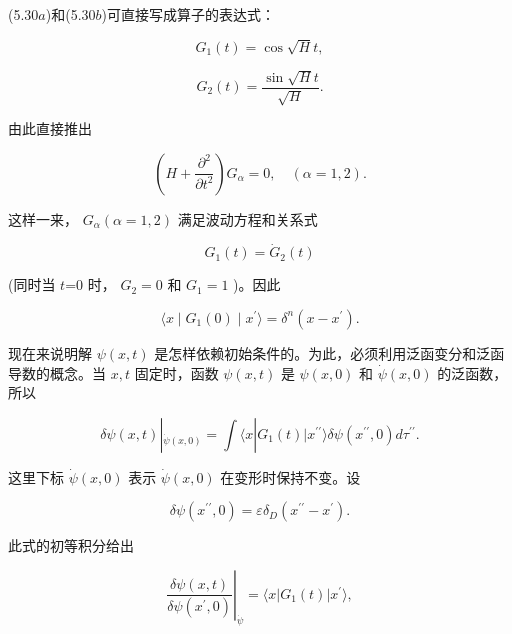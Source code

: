 (5.30$a$)和(5.30$b$)可直接写成算子的表达式：

\begin{equation*}
G _ {1} (t) = \cos \sqrt {H} t,
\end{equation*}

\begin{equation*}
G _ {2} (t) = \frac {\sin \sqrt {H} t}{\sqrt {H}}.
\end{equation*}

由此直接推出

\begin{equation*}
\left(H + \frac {\partial^ {2}}{\partial t ^ {2}}\right) G _ {\alpha} = 0, \quad (\alpha = 1, 2).\tag{5.31}
\end{equation*}

这样一来， $G_{\alpha}(\alpha = 1,2)$ 满足波动方程和关系式

\begin{equation*}
G _ {1} (t) = \dot {G} _ {2} (t)
\end{equation*}

(同时当 $t$=0 时， $G_{2}=0$ 和 $G_{1}=1$ )。因此

\begin{equation*}
\langle x \mid G _ {1} (0) \mid x ^ {\prime} \rangle = \delta^ {n} (x - x ^ {\prime}).
\end{equation*}

现在来说明解 $\psi(x, t)$ 是怎样依赖初始条件的。为此，必须利用泛函变分和泛函导数的概念。当 $x, t$ 固定时，函数 $\psi(x, t)$ 是 $\psi(x, 0)$ 和 $\dot{\psi}(x, 0)$ 的泛函数，所以

\begin{equation*}
\delta \psi (x, t) | _ {\dot {\psi} (x, 0)} = \int \langle x | G _ {1} (t) | x ^ {\prime \prime} \rangle \delta \psi (x ^ {\prime \prime}, 0) d \tau^ {\prime \prime}.
\end{equation*}

这里下标 $\dot{\psi}(x,0)$ 表示 $\dot{\psi}(x,0)$ 在变形时保持不变。设

\begin{equation*}
\delta \psi (x ^ {\prime \prime}, 0) = \varepsilon \delta_ {D} (x ^ {\prime \prime} - x ^ {\prime}).
\end{equation*}

此式的初等积分给出

\begin{equation*}
\left. \frac {\delta \psi (x , t)}{\delta \psi (x ^ {\prime} , 0)} \right| _ {\dot {\psi}} = \langle x | G _ {1} (t) | x ^ {\prime} \rangle ,\tag{5.32}
\end{equation*}


